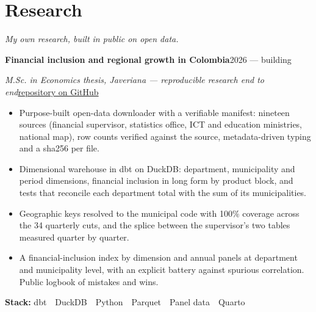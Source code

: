 \documentclass[a4paper,10pt]{article}
\newcommand{\headline}[2]{\needspace{3\baselineskip}\textbf{\color{ink}#1}\hfill{\small #2}\par}
\newcommand{\subline}[2]{\textit{#1}\hfill{\small #2}\par}
\begin{document}
\section*{Research}
{\small\itshape My own research, built in public on open data.}\par\vspace{3pt}
\headline{Financial inclusion and regional growth in Colombia}{2026 --- building}
\subline{M.Sc. in Economics thesis, Javeriana --- reproducible research end to end}{\href{https://github.com/DavinsonR/financial-inclusion-colombia}{repository on GitHub}}
\begin{itemize}[leftmargin=1.1em, itemsep=0pt, topsep=1pt, parsep=0pt]
  \item Purpose-built open-data downloader with a verifiable manifest: nineteen sources (financial supervisor, statistics office, ICT and education ministries, national map), row counts verified against the source, metadata-driven typing and a sha256 per file.
  \item Dimensional warehouse in dbt on DuckDB: department, municipality and period dimensions, financial inclusion in long form by product block, and tests that reconcile each department total with the sum of its municipalities.
  \item Geographic keys resolved to the municipal code with 100\% coverage across the 34 quarterly cuts, and the splice between the supervisor's two tables measured quarter by quarter.
  \item A financial-inclusion index by dimension and annual panels at department and municipality level, with an explicit battery against spurious correlation. Public logbook of mistakes and wins.
\end{itemize}
{\small\textbf{Stack:} dbt \,\textperiodcentered\, DuckDB \,\textperiodcentered\, Python \,\textperiodcentered\, Parquet \,\textperiodcentered\, Panel data \,\textperiodcentered\, Quarto}\par
\vspace{4pt}
\end{document}
